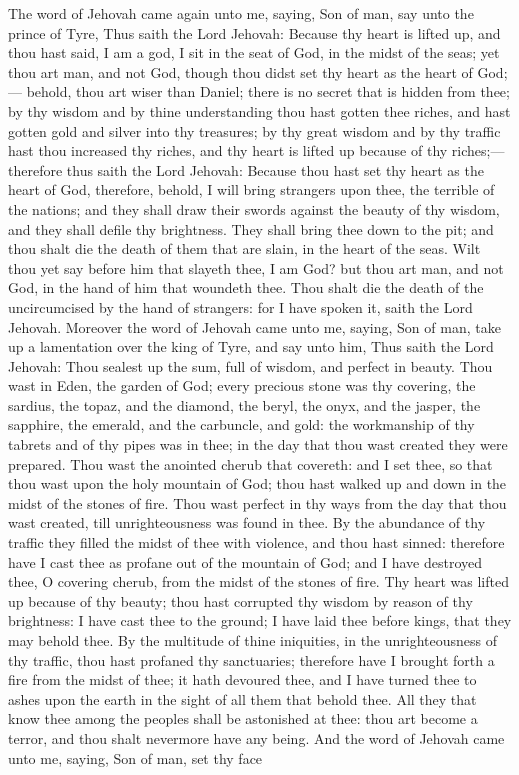 The word of Jehovah came again unto me, saying, Son of man, say unto the prince of Tyre, Thus saith the Lord Jehovah: Because thy heart is lifted up, and thou hast said, I am a god, I sit in the seat of God, in the midst of the seas; yet thou art man, and not God, though thou didst set thy heart as the heart of God;— behold, thou art wiser than Daniel; there is no secret that is hidden from thee; by thy wisdom and by thine understanding thou hast gotten thee riches, and hast gotten gold and silver into thy treasures; by thy great wisdom and by thy traffic hast thou increased thy riches, and thy heart is lifted up because of thy riches;— therefore thus saith the Lord Jehovah: Because thou hast set thy heart as the heart of God, therefore, behold, I will bring strangers upon thee, the terrible of the nations; and they shall draw their swords against the beauty of thy wisdom, and they shall defile thy brightness. They shall bring thee down to the pit; and thou shalt die the death of them that are slain, in the heart of the seas. Wilt thou yet say before him that slayeth thee, I am God? but thou art man, and not God, in the hand of him that woundeth thee. Thou shalt die the death of the uncircumcised by the hand of strangers: for I have spoken it, saith the Lord Jehovah.  Moreover the word of Jehovah came unto me, saying, Son of man, take up a lamentation over the king of Tyre, and say unto him, Thus saith the Lord Jehovah: Thou sealest up the sum, full of wisdom, and perfect in beauty. Thou wast in Eden, the garden of God; every precious stone was thy covering, the sardius, the topaz, and the diamond, the beryl, the onyx, and the jasper, the sapphire, the emerald, and the carbuncle, and gold: the workmanship of thy tabrets and of thy pipes was in thee; in the day that thou wast created they were prepared. Thou wast the anointed cherub that covereth: and I set thee, so that thou wast upon the holy mountain of God; thou hast walked up and down in the midst of the stones of fire. Thou wast perfect in thy ways from the day that thou wast created, till unrighteousness was found in thee. By the abundance of thy traffic they filled the midst of thee with violence, and thou hast sinned: therefore have I cast thee as profane out of the mountain of God; and I have destroyed thee, O covering cherub, from the midst of the stones of fire. Thy heart was lifted up because of thy beauty; thou hast corrupted thy wisdom by reason of thy brightness: I have cast thee to the ground; I have laid thee before kings, that they may behold thee. By the multitude of thine iniquities, in the unrighteousness of thy traffic, thou hast profaned thy sanctuaries; therefore have I brought forth a fire from the midst of thee; it hath devoured thee, and I have turned thee to ashes upon the earth in the sight of all them that behold thee. All they that know thee among the peoples shall be astonished at thee: thou art become a terror, and thou shalt nevermore have any being.  And the word of Jehovah came unto me, saying, Son of man, set thy face 